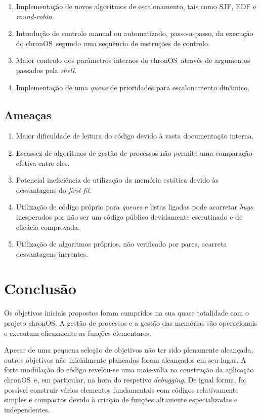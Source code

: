 \documentclass[10pt,oneside]{estiloUBI}
\newcommand{\chronOS}{\textsf{chronOS}}
\begin{document}
	\begin{enumerate}
		\item Implementação de novos algoritmos de escalonamento, tais como \ac{SJF}, \ac{EDF} e \textit{round-robin}.
		\item Introdução de controlo manual ou automatizado, passo-a-passo, da execução do \chronOS~segundo uma sequência de instruções de controlo.
		\item Maior controlo dos parâmetros internos do \chronOS~através de argumentos passados pela \textit{shell}.
		\item Implementação de uma \textit{queue} de prioridades para escalonamento dinâmico.
	\end{enumerate}
	
	
	\subsection{Ameaças}
	
	\begin{enumerate}
		\item Maior dificuldade de leitura do código devido à vasta documentação interna.
		\item Escassez de algoritmos de gestão de processos não permite uma comparação efetiva entre eles.
		\item Potencial ineficiência de utilização da memória estática devido às desvantagens do \textit{first-fit}.
		\item Utilização de código próprio para \textit{queues} e listas ligadas pode acarretar \textit{bugs} inesperados por não ser um código público devidamente escrutinado e de eficácia comprovada.
		\item Utilização de algoritmos próprios, não verificado por pares, acarreta desvantagens inerentes.
	\end{enumerate}
	
	
	\section{Conclusão}
	
	Os objetivos iniciais propostos foram cumpridos na sua quase totalidade com o projeto \chronOS. A gestão de processos e a gestão das memórias são operacionais e executam eficazmente as funções elementares.
	
	Apesar de uma pequena seleção de objetivos não ter sido plenamente alcançada, outros objetivos não inicialmente planeados foram alcançados em seu lugar. A forte modulação do código revelou-se uma mais-valia na construção da aplicação \chronOS~e, em particular, na hora do respetivo \textit{debugging}. De igual forma, foi possível construir vários elementos fundamentais com códigos relativamente simples e compactos devido à criação de funções altamente especializadas e independentes.
	
\end{document}
